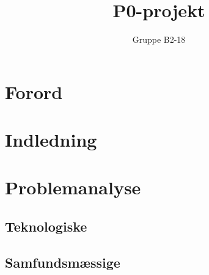 \documentclass[12pt,hidelinks]{article}
\begin{document}
    \sloppy
	\title{P0-projekt}
	\author{Gruppe B2-18}
	\maketitle
	\section{Forord}
	\tableofcontents
	\section{Indledning}
	\section{Problemanalyse}
	
	\subsection{Teknologiske}
	
	
	
	\subsection{Samfundsmæssige}
	
	
	
	
\end{document}

